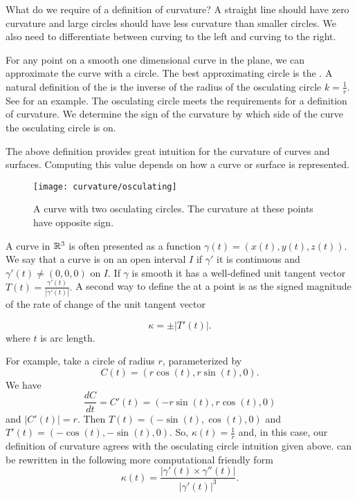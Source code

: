 


What  do we require of a definition of curvature?
A straight line should have zero curvature and
 large circles should have less curvature than smaller circles.
We also need to differentiate between
curving to the left and curving to the right.

For any point on a smooth one dimensional curve in the plane,
we can approximate the curve with a circle.
The best approximating circle is the  .
A natural definition of the  is the inverse of the radius of the osculating
 circle $k=\frac{1}{r}$.
See  for an example.
The osculating circle meets the requirements for a definition of curvature.
We determine the sign of the curvature by which side of the curve the osculating circle is on.




The above definition provides great intuition for the curvature of curves
and surfaces.
Computing this value depends on how a curve or surface is represented. 

\begin{figure}[htb]
	\centering
	\texttt{[image: curvature/osculating]}
	\caption{A curve with two osculating circles. The curvature at these points
	have opposite sign.}
	\label{fig:osculating-circle}
\end{figure}

A curve in $\mathbb{R}^3$ is often presented as a function
$\gamma(t)=(x(t),y(t),z(t))$. We say that a curve is  on an open interval $I$
if $\gamma'$ it is continuous and $\gamma'(t)\neq (0,0,0)$ on $I$. 
If $\gamma$ is smooth it has a well-defined unit tangent vector $T(t)=\frac{\gamma'(t)}{|\gamma'(t)|}.$
A second way to define the   at a point is as the signed magnitude of the rate of change of the 
unit tangent vector

\begin{equation} \label{eqn:kappa}
\kappa= \pm | T'(t)|.
\end{equation}
where $t$ is arc length.

For example, take a circle of radius $r$, parameterized by 
$$C(t)=\left(r\cos(t),r\sin(t),0\right).$$
We have 
$$\frac{dC}{dt}=C'(t)=\left(-r\sin(t),r\cos(t),0\right)$$ and $|C'(t)|=r.$
Then $T(t)=\left(-\sin(t),\cos(t),0\right)$ and
$T'(t)=\left(-\cos(t),-\sin(t),0\right)$.
So, $\kappa(t)=\frac{1}{r}$ and, in this case, our definition of curvature agrees with the
osculating circle intuition given above. 
 can be rewritten in the following more computational friendly form 
\begin{equation} \label{eqn:kappa1}
\kappa(t)=\frac{|\gamma'(t)\times \gamma''(t)|}{|\gamma'(t)|^3}.
\end{equation}

